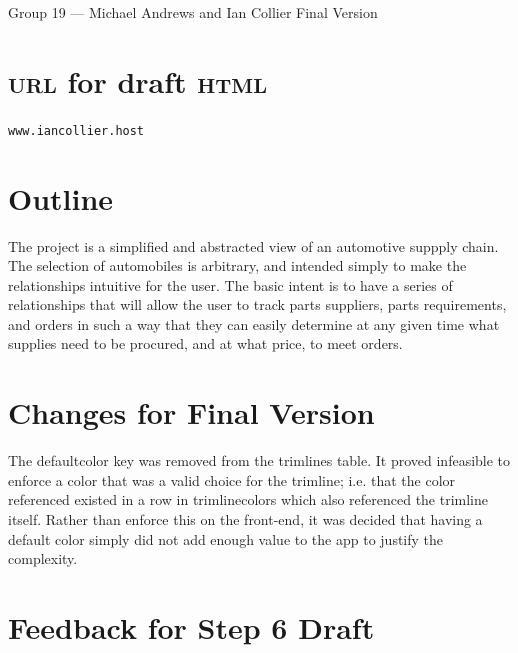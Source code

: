 \documentclass[11pt,letterpaper,oneside]{amsart}
\begin{document}
Group 19 --- Michael Andrews and Ian Collier
Final Version

\section*{\textsc{url} for draft \textsc{html}}

\texttt{www.iancollier.host}

\section*{Outline}


The project is a simplified and abstracted view of an automotive suppply chain.  The selection of automobiles is arbitrary, and intended simply to make the relationships intuitive for the user.  The basic intent is to have a series of relationships that will allow the user to track parts suppliers, parts requirements, and orders in such a way that they can easily determine at any given time what supplies need to be procured, and at what price, to meet orders.

\section*{Changes for Final Version}

The default\textunderscore color key was removed from the trimlines table.  It proved infeasible to enforce a color that was a valid choice for the trimline; i.e. that the color referenced existed in a row in trimline\textunderscore colors which also referenced the trimline itself.  Rather than enforce this on the front-end, it was decided that having a default color simply did not add enough value to the app to justify the complexity.

\section*{Feedback for Step 6 Draft}
\end{document}
